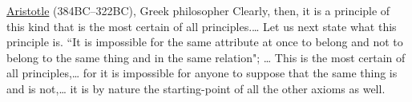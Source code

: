 \qboxns
  {\href{http://en.wikipedia.org/wiki/Aristotle}{Aristotle} (384BC--322BC),
   Greek philosopher
   \footnotemark
  }
  {Clearly, then, it is a principle of this kind that is the most certain of all principles.\ldots 
   Let us next state what this principle is.
   ``It is impossible for the same attribute at once to belong and not to belong 
     to the same thing and in the same relation"; \ldots
   This is the most certain of all principles,\ldots
   for it is impossible for anyone to suppose that the same thing is and is not,\ldots 
   it is by nature the starting-point of all the other axioms as well.}

%

